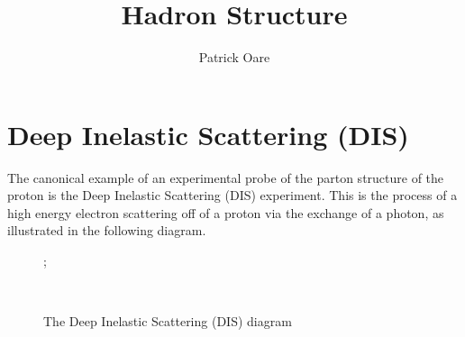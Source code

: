 \documentclass[11pt, oneside]{article}   	%
\title{Hadron Structure}
\author{Patrick Oare}
\date{}							%
\theoremstyle{definition}
\begin{document}
\maketitle

\section{Deep Inelastic Scattering (DIS)}

The canonical example of an experimental probe of the parton structure of the proton is the Deep Inelastic Scattering (DIS) 
experiment. This is the process of a high energy electron scattering off of a proton via the exchange of a photon, as 
illustrated in the following diagram. 
\begin{figure}[H]
\centering
{};
\caption{The Deep Inelastic Scattering (DIS) diagram}~
\label{fig:dis}
\end{figure}
\end{document}
